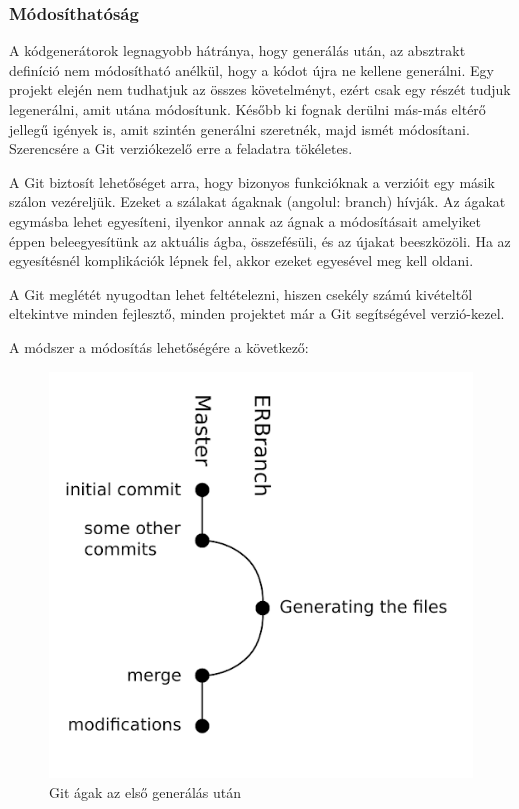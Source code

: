 \documentclass[a4paper,12pt,oneside]{report}
\begin{document}
\newpage
\subsubsection{Módosíthatóság}

\begin{justify}


    A kódgenerátorok legnagyobb hátránya, hogy generálás után, az absztrakt definíció nem módosítható anélkül, hogy a kódot újra ne kellene generálni. Egy projekt elején nem tudhatjuk az összes követelményt, ezért csak egy részét tudjuk legenerálni, amit utána módosítunk. Később ki fognak derülni más-más eltérő jellegű igények is, amit szintén generálni szeretnék, majd ismét módosítani. Szerencsére a Git verziókezelő erre a feladatra tökéletes. 
    
    A Git biztosít lehetőséget arra, hogy bizonyos funkcióknak a verzióit egy másik szálon vezéreljük. Ezeket a szálakat ágaknak (angolul: branch) hívják. Az ágakat egymásba lehet egyesíteni, ilyenkor annak az ágnak a módosításait amelyiket éppen beleegyesítünk az aktuális ágba, összefésüli, és az újakat beeszközöli. Ha az egyesítésnél komplikációk lépnek fel, akkor ezeket egyesével meg kell oldani. 

	A Git meglétét nyugodtan lehet feltételezni, hiszen csekély számú kivételtől eltekintve minden fejlesztő, minden projektet már a Git segítségével verzió-kezel.

	A módszer a módosítás lehetőségére a következő:


    \begin{figure}[H]
        \centering
		\includegraphics[width=12cm]{contents/images/git_first.png}
		\caption{Git ágak az első generálás után}
		\label{fig:git_first}
	\end{figure}


\end{justify}
\end{document}
